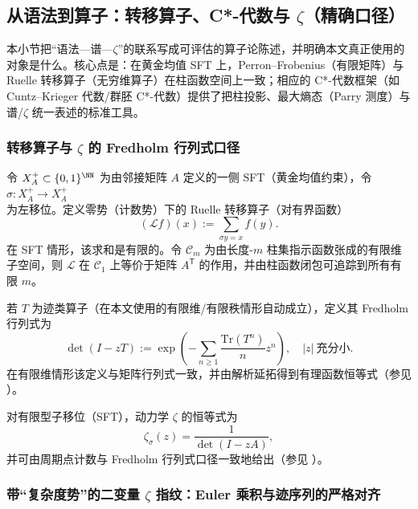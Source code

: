 \subsection{从语法到算子：转移算子、C*-代数与 \texorpdfstring{$\zeta$}{zeta}（精确口径）}\label{subsec:operator-zeta-interface}

本小节把“语法—谱—$\zeta$”的联系写成可评估的算子论陈述，并明确本文真正使用的对象是什么。核心点是：在黄金均值 SFT 上，Perron--Frobenius（有限矩阵）与 Ruelle 转移算子（无穷维算子）在柱函数空间上一致；相应的 C*-代数框架（如 Cuntz--Krieger 代数/群胚 C*-代数）提供了把柱投影、最大熵态（Parry 测度）与谱/$\zeta$ 统一表述的标准工具。

\subsubsection{转移算子与 \texorpdfstring{$\zeta$}{zeta} 的 Fredholm 行列式口径}

令 $X_A^+\subset\{0,1\}^{\NN}$ 为由邻接矩阵 $A$ 定义的一侧 SFT（黄金均值约束），令 $\sigma:X_A^+\to X_A^+$ 为左移位。定义零势（计数势）下的 Ruelle 转移算子（对有界函数）
\[
(\mathcal{L}f)(x):=\sum_{\sigma y=x} f(y).
\]
在 SFT 情形，该求和是有限的。令 $\mathcal{C}_m$ 为由长度-$m$ 柱集指示函数张成的有限维子空间，则 $\mathcal{L}$ 在 $\mathcal{C}_1$ 上等价于矩阵 $A^{\mathsf T}$ 的作用，并由柱函数闭包可追踪到所有有限 $m$。

\begin{definition}\label{def:fredholm-determinant}
若 $T$ 为迹类算子（在本文使用的有限维/有限秩情形自动成立），定义其 Fredholm 行列式为
\[
\det(I-zT):=\exp\left(-\sum_{n\ge 1}\frac{\mathrm{Tr}(T^n)}{n}z^n\right),
\quad |z|\ \text{充分小}.
\]
在有限维情形该定义与矩阵行列式一致，并由解析延拓得到有理函数恒等式（参见 \cite{Ruelle1976ZetaExpanding,ParryPollicott1990Zeta}）。
\end{definition}

对有限型子移位（SFT），动力学 $\zeta$ 的恒等式为
\[
\zeta_\sigma(z)=\frac{1}{\det(I-zA)},
\]
并可由周期点计数与 Fredholm 行列式口径一致地给出（参见 \cite{LindMarcus1995,Ruelle1976ZetaExpanding,Ruelle1978Thermodynamic,ParryPollicott1990Zeta}）。

\subsubsection{带“复杂度势”的二变量 \texorpdfstring{$\zeta$}{zeta} 指纹：Euler 乘积与迹序列的严格对齐}\label{subsec:zeta-two-variable-kappa}

